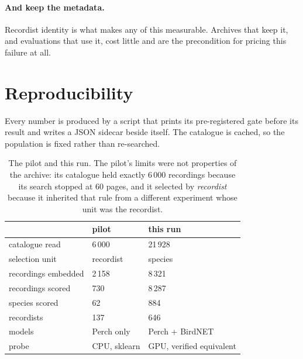 \documentclass[10pt,twocolumn,a4paper]{article}
\begin{document}
\paragraph{And keep the metadata.} Recordist identity is what makes any of this measurable.
Archives that keep it, and evaluations that use it, cost little and are the precondition for
pricing this failure at all.

\section{Reproducibility}
\label{sec:repro}

Every number is produced by a script that prints its pre-registered gate before its result and
writes a JSON sidecar beside itself. The catalogue is cached, so the population is fixed
rather than re-searched.

\begin{table}[t]
\footnotesize
\setlength{\tabcolsep}{4pt}
\caption{The pilot and this run. The pilot's limits were not properties of the archive: its
catalogue held exactly 6\,000 recordings because its search stopped at 60 pages, and it
selected by \emph{recordist} because it inherited that rule from a different experiment whose
unit was the recordist.}
\label{tab:pilot}
\begin{tabular}{L{2.6cm} L{2.2cm} L{2.4cm}}
\toprule
 & pilot & this run \\
\midrule
catalogue read      & 6\,000        & 21\,928 \\
selection unit      & recordist     & species \\
recordings embedded & 2\,158        & 8\,321 \\
recordings scored   & 730           & 8\,287 \\
species scored      & 62            & 884 \\
recordists          & 137           & 646 \\
models              & Perch only    & Perch + BirdNET \\
probe               & CPU, sklearn  & GPU, verified equivalent \\
\bottomrule
\end{tabular}
\end{table}
\end{document}
